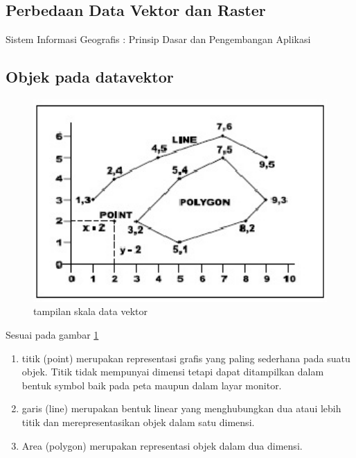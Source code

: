  
\subsection {Perbedaan Data Vektor dan Raster}
Sistem Informasi Geografis : Prinsip Dasar dan Pengembangan Aplikasi
\subsection {Objek pada datavektor}
\begin{figure}[ht]
\centerline{\includegraphics[width=1\textwidth] {figures/vektor02.JPG}}
\caption{tampilan skala data vektor}
\label{vektor02}
\end{figure}
Sesuai pada gambar \ref{vektor02} 
\begin{enumerate}
Objek yang dibangun terbagi menjadi tiga bagian lagi, yaitu berupa titik (point), garis (line), dan area (polygon). 
\item titik (point) merupakan representasi grafis yang paling sederhana pada suatu objek. Titik tidak mempunyai dimensi tetapi dapat ditampilkan dalam bentuk symbol baik pada peta maupun dalam layar monitor.
\item garis (line) merupakan bentuk linear yang menghubungkan dua ataui lebih titik dan merepresentasikan objek dalam satu dimensi. 
\item Area (polygon) merupakan representasi objek dalam dua dimensi.
\end{enumerate}


